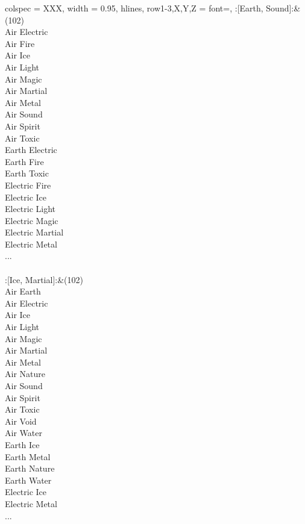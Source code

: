 \begin{longtblr}[
	caption = {2v2 Attacking Effective},
	label = {2v2-Attacking-Effective},
]{
	colspec = {XXX}, width = 0.95\linewidth,
	hlines,
	row{1-3,X,Y,Z} = {font=\bfseries},
}
	:[Earth, Sound]:&{(102)\\
	Air Electric \\
	Air Fire \\
	Air Ice \\
	Air Light \\
	Air Magic \\
	Air Martial \\
	Air Metal \\
	Air Sound \\
	Air Spirit \\
	Air Toxic \\
	Earth Electric \\
	Earth Fire \\
	Earth Toxic \\
	Electric Fire \\
	Electric Ice \\
	Electric Light \\
	Electric Magic \\
	Electric Martial \\
	Electric Metal \\
	...\\
	}\\

	:[Ice, Martial]:&{(102)\\
	Air Earth \\
	Air Electric \\
	Air Ice \\
	Air Light \\
	Air Magic \\
	Air Martial \\
	Air Metal \\
	Air Nature \\
	Air Sound \\
	Air Spirit \\
	Air Toxic \\
	Air Void \\
	Air Water \\
	Earth Ice \\
	Earth Metal \\
	Earth Nature \\
	Earth Water \\
	Electric Ice \\
	Electric Metal \\
	...\\
	}\\


\end{longtblr}
